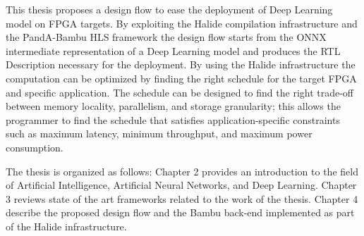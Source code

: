 \documentclass[../main.tex]{subfiles}
\begin{document}
This thesis proposes a design flow to ease the deployment of Deep Learning model on FPGA targets. 
By exploiting the Halide compilation infrastructure and the PandA-Bambu HLS framework the design flow starts from the ONNX intermediate representation of a Deep Learning model and produces the RTL Description necessary for the deployment.
By using the Halide infrastructure the computation can be optimized by finding the right schedule for the target FPGA and specific application.
The schedule can be designed to find the right trade-off between memory locality, parallelism, and storage granularity; this allows the programmer to find the schedule that satisfies application-specific constraints such as maximum latency, minimum throughput, and maximum power consumption.

The thesis is organized as follows: Chapter 2 provides an introduction to the field of Artificial Intelligence, Artificial Neural Networks, and Deep Learning. Chapter 3 reviews state of the art frameworks related to the work of the thesis. Chapter 4 describe the proposed design flow and the Bambu back-end implemented as part of the Halide infrastructure.
\end{document}
